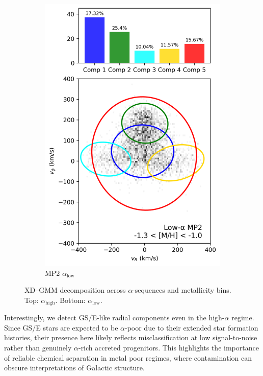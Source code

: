 \documentclass[a4paper,10pt]{article}
\begin{document}
\begin{multicols}{2}
\begin{figure}[H]
\begin{subfigure}[t]{0.24\linewidth}
    \includegraphics[width=\linewidth]{../figures/gmm_mp2_low_alpha_k6.png}
    \caption{MP2 $\alpha_{\mathrm{low}}$}
  \end{subfigure}

  \caption{XD–GMM decomposition across $\alpha$-sequences and metallicity bins. Top: $\alpha_{\mathrm{high}}$. Bottom: $\alpha_{\mathrm{low}}$.}
  \label{fig:gmm_alpha_bins}
\end{figure}


Interestingly, we detect GS/E-like radial components even in the high-$\alpha$ regime. 
Since GS/E stars are expected to be $\alpha$-poor due to their extended star formation histories, 
their presence here likely reflects misclassification at low signal-to-noise rather than genuinely 
$\alpha$-rich accreted progenitors. This highlights the importance of reliable chemical 
separation in metal poor regimes, where contamination can obscure interpretations of Galactic structure.



\end{multicols}
\end{document}
